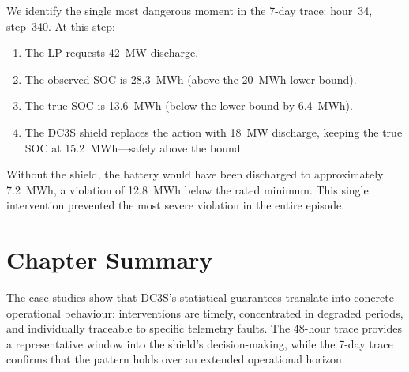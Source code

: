 We identify the single most dangerous moment in the 7-day trace: hour~34,
step~340.  At this step:
\begin{enumerate}
  \item The LP requests 42~MW discharge.
  \item The observed SOC is 28.3~MWh (above the 20~MWh lower bound).
  \item The true SOC is 13.6~MWh (below the lower bound by 6.4~MWh).
  \item The DC3S shield replaces the action with 18~MW discharge,
    keeping the true SOC at 15.2~MWh---safely above the bound.
\end{enumerate}

Without the shield, the battery would have been discharged to approximately
7.2~MWh, a violation of 12.8~MWh below the rated minimum.  This single
intervention prevented the most severe violation in the entire episode.

\section{Chapter Summary}

The case studies show that DC3S's statistical guarantees translate into
concrete operational behaviour: interventions are timely, concentrated in
degraded periods, and individually traceable to specific telemetry faults.
The 48-hour trace provides a representative window into the shield's
decision-making, while the 7-day trace confirms that the pattern holds
over an extended operational horizon.
